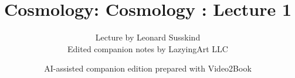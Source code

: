 \documentclass[11pt,oneside]{book}
\begin{document}
\frontmatter
\title{Cosmology: Cosmology : Lecture 1}
\author{Lecture by Leonard Susskind\\Edited companion notes by LazyingArt LLC}
\date{AI-assisted companion edition prepared with Video2Book}
\maketitle
\clearpage
\mainmatter

\end{document}
